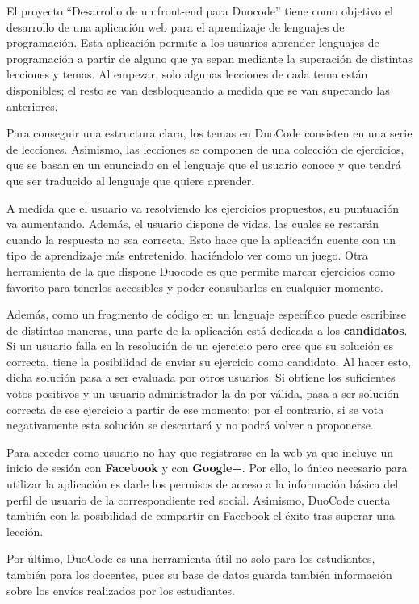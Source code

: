 
El proyecto ``Desarrollo de un front-end para Duocode'' tiene como objetivo el desarrollo de una aplicación web para el aprendizaje de lenguajes de programación. Esta aplicación permite a los usuarios aprender lenguajes de programación a partir de alguno que ya sepan mediante la superación de distintas lecciones y temas. Al empezar, solo algunas lecciones de cada tema están disponibles; el resto se van desbloqueando a medida que se van superando las anteriores.

Para conseguir una estructura clara, los temas en DuoCode consisten en una serie de lecciones. Asimismo, las lecciones se componen de una colección de ejercicios, que se basan en un enunciado en el lenguaje que el usuario conoce y que tendrá que ser traducido al lenguaje que quiere aprender.

A medida que el usuario va resolviendo los ejercicios propuestos, su puntuación va aumentando. Además, el usuario dispone de vidas, las cuales se restarán cuando la respuesta no sea correcta. Esto hace que la aplicación cuente con un tipo de aprendizaje más entretenido, haciéndolo ver como un juego. Otra herramienta de la que dispone Duocode es que permite marcar ejercicios como favorito para tenerlos accesibles y poder consultarlos en cualquier momento.

Además, como un fragmento de código en un lenguaje específico puede escribirse de distintas maneras, una parte de la aplicación está dedicada a los \textbf{candidatos}. Si un usuario falla en la resolución de un ejercicio pero cree que su solución es correcta, tiene la posibilidad de enviar su ejercicio como candidato. Al hacer esto, dicha solución pasa a ser evaluada por otros usuarios. Si obtiene los suficientes votos positivos y un usuario administrador la da por válida, pasa a ser solución correcta de ese ejercicio a partir de ese momento; por el contrario, si se vota negativamente esta solución se descartará y no podrá volver a proponerse.

Para acceder como usuario no hay que registrarse en la web ya que incluye un inicio de sesión con \textbf{Facebook} y con \textbf{Google+}. Por ello, lo único necesario para utilizar la aplicación es
darle los permisos de acceso a la información básica del perfil de usuario de la correspondiente red social. Asimismo, DuoCode cuenta también con la posibilidad de compartir en Facebook el éxito tras superar una lección.

Por último, DuoCode es una herramienta útil no solo para los estudiantes, también para los docentes, pues su base de datos guarda también información sobre los envíos realizados por los estudiantes.

